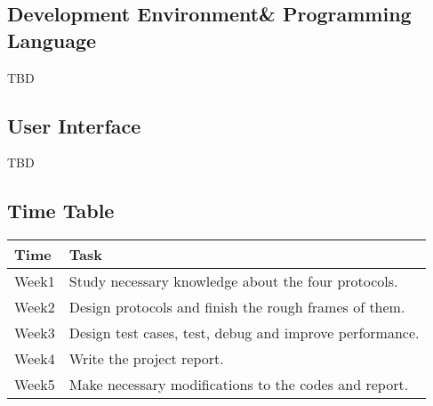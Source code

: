 \documentclass{article}
\begin{document}
\subsection*{Development Environment\& Programming Language}
TBD

\subsection*{User Interface}
TBD

\subsection*{Time Table}
\begin{table}[htbp]
\begin{tabular}{ll}
\toprule
Time & Task \\
\midrule
Week1 & Study necessary knowledge about the four protocols. \\
Week2 & Design protocols and finish the rough frames of them. \\
Week3 & Design test cases, test, debug and improve performance. \\
Week4 & Write the project report. \\
Week5 & Make necessary modifications to the codes and report. \\
\bottomrule
\end{tabular}
\end{table}
\end{document}
